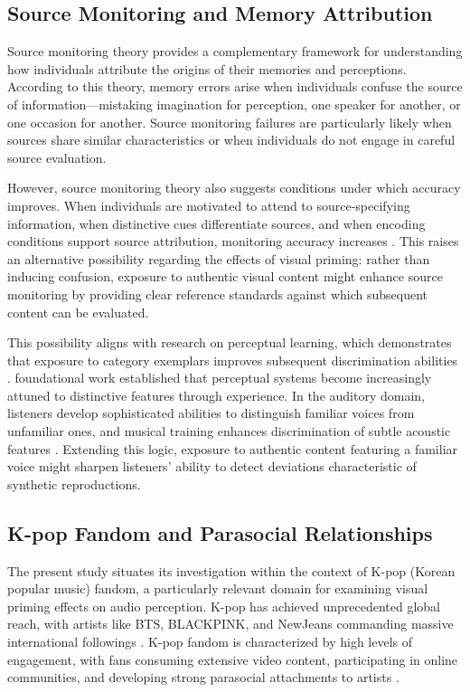 \documentclass[12pt, a4paper]{article}
\begin{document}
\subsection{Source Monitoring and Memory Attribution}

Source monitoring theory \citep{johnson1993source} provides a complementary framework for understanding how individuals attribute the origins of their memories and perceptions. According to this theory, memory errors arise when individuals confuse the source of information---mistaking imagination for perception, one speaker for another, or one occasion for another. Source monitoring failures are particularly likely when sources share similar characteristics or when individuals do not engage in careful source evaluation.

However, source monitoring theory also suggests conditions under which accuracy improves. When individuals are motivated to attend to source-specifying information, when distinctive cues differentiate sources, and when encoding conditions support source attribution, monitoring accuracy increases \citep{johnson1993source, lindsay2014sourcemonitoring}. This raises an alternative possibility regarding the effects of visual priming: rather than inducing confusion, exposure to authentic visual content might enhance source monitoring by providing clear reference standards against which subsequent content can be evaluated.

This possibility aligns with research on perceptual learning, which demonstrates that exposure to category exemplars improves subsequent discrimination abilities \citep{goldstone1998perceptual}. \citet{gibson1969perceptual} foundational work established that perceptual systems become increasingly attuned to distinctive features through experience. In the auditory domain, listeners develop sophisticated abilities to distinguish familiar voices from unfamiliar ones, and musical training enhances discrimination of subtle acoustic features \citep{kraus2014music}. Extending this logic, exposure to authentic content featuring a familiar voice might sharpen listeners' ability to detect deviations characteristic of synthetic reproductions.

\subsection{K-pop Fandom and Parasocial Relationships}

The present study situates its investigation within the context of K-pop (Korean popular music) fandom, a particularly relevant domain for examining visual priming effects on audio perception. K-pop has achieved unprecedented global reach, with artists like BTS, BLACKPINK, and NewJeans commanding massive international followings \citep{jin2016new, yoon2019kpop}. K-pop fandom is characterized by high levels of engagement, with fans consuming extensive video content, participating in online communities, and developing strong parasocial attachments to artists \citep{lee2019kpop, yue2021parasocial}.
\end{document}
